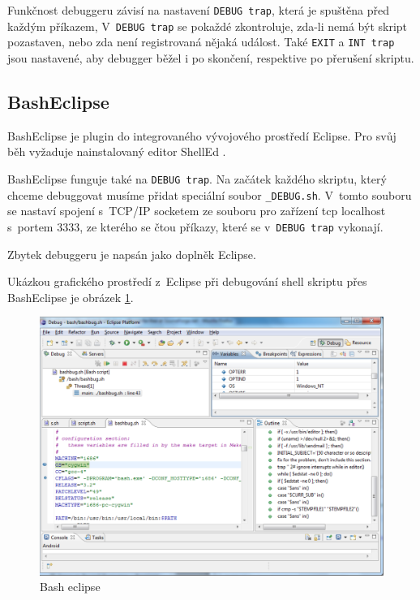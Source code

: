 \documentclass[thesis=M,czech]{FITthesis}[2012/06/26]
\begin{document}
Funkčnost debuggeru závisí na nastavení \texttt{DEBUG trap}, která je spuštěna před každým příkazem, V~\texttt{DEBUG trap} se pokaždé zkontroluje, zda-li nemá být skript pozastaven, nebo zda není registrovaná nějaká událost. Také \texttt{EXIT} a \texttt{INT trap} jsou nastavené, aby debugger běžel i po skončení, respektive po přerušení skriptu.





\subsection{BashEclipse}

BashEclipse \cite{basheclipse} je plugin do integrovaného vývojového prostředí Eclipse. Pro svůj běh vyžaduje nainstalovaný editor ShellEd \cite{shelled}.

BashEclipse funguje také na \texttt{DEBUG trap}. Na začátek každého skriptu, který chceme debuggovat musíme přidat speciální soubor \texttt{\_DEBUG.sh}. V~tomto souboru se nastaví spojení s~TCP/IP socketem ze souboru pro zařízení tcp localhost s~portem 3333, ze kterého se čtou příkazy, které se v~\texttt{DEBUG trap} vykonají.

Zbytek debuggeru je napsán jako doplněk Eclipse.

Ukázkou grafického prostředí z~Eclipse při debugování shell skriptu přes BashEclipse je obrázek \ref{fig:bash_eclipse}.

\begin{figure}
	\includegraphics[width=1.0\textwidth]{./images/bash_eclipse}
	\caption{Bash eclipse}
	\label{fig:bash_eclipse}
\end{figure}
\end{document}
